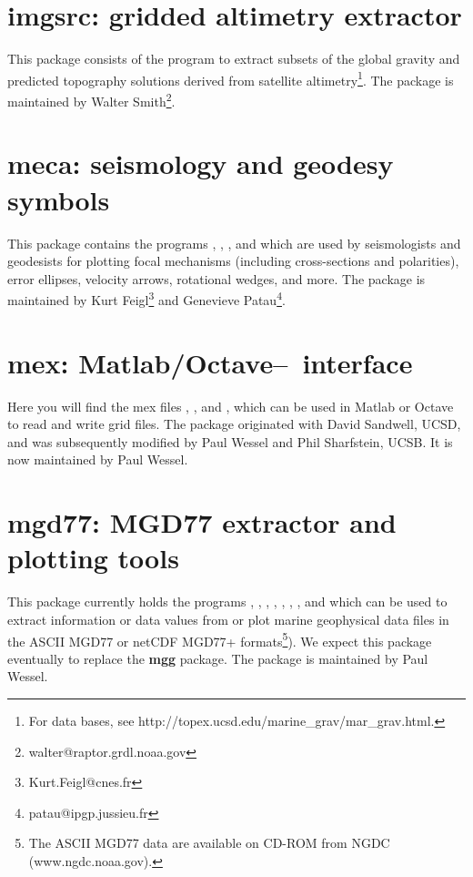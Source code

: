 \section{imgsrc: gridded altimetry extractor}

This package consists of the program  to
extract subsets of the global gravity and predicted topography
solutions derived from satellite altimetry\footnote{For data bases,
see http://topex.ucsd.edu/marine\_grav/mar\_grav.html.}.  The package
is maintained by Walter Smith\footnote{walter@raptor.grdl.noaa.gov}.

\section{meca: seismology and geodesy symbols}

This package contains the programs , ,
, and  which are used
by seismologists and geodesists for plotting focal mechanisms (including
cross-sections and polarities), error ellipses, velocity arrows, rotational
wedges, and more.  The package is maintained by
Kurt Feigl\footnote{Kurt.Feigl@cnes.fr} and
Genevieve Patau\footnote{patau@ipgp.jussieu.fr}.

\section{mex: Matlab/Octave--\gmt\ interface}

Here you will find the mex files , ,
and , which can be used in Matlab or Octave to read and write
grid files.  The package originated with David Sandwell, UCSD,
and was subsequently modified by Paul Wessel and Phil Sharfstein, UCSB.
It is now maintained by Paul Wessel.

\section{mgd77: MGD77 extractor and plotting tools}

This package currently holds the programs , , ,
, , , , and  which can be
used to extract information or data values from or plot marine geophysical
data files in the ASCII MGD77 or netCDF MGD77+ formats\footnote{The ASCII MGD77 data are available on CD-ROM from NGDC
(www.ngdc.noaa.gov).}).  We expect this package eventually to replace the {\bf mgg} package.
The package is maintained by Paul Wessel.

